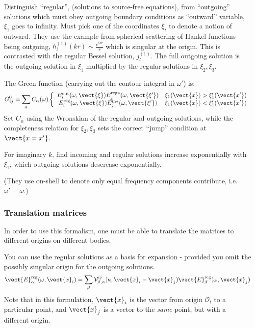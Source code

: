 Distinguish ``regular'', (solutions to source-free equations), from ``outgoing'' solutions
which must obey outgoing boundary conditions as ``outward'' variable, $\xi_1$ goes to infinity.
Must pick one of the coordinates $\xi_i$ to denote a notion of outward.  
They use the example from spherical scattering of Hankel functions being outgoing, $h_l^{(1)}(kr)\sim \frac{e^{ikr}}{r}$
which is singular at the origin.  This is contrasted with the regular Bessel solution, $j_l^{(1)}$.  
The full outgoing solution is the outgoing solution in $\xi_1$ multiplied by the regular solutions
in $\xi_2,\xi_3$.  

The Green function (carrying out the contour integral in $\omega'$) is:
\begin{equation}
G^0_{ij}=\sum_\alpha C_\alpha(\omega)\left\{\begin{array}{cr}
E_i^\mathrm{out}(\omega,\vect{\xi}) E_j^{\mathrm{reg}*}(\omega,\vect{\xi'}) & \xi_1(\vect{x})>\xi_1'(\vect{x'})\\
E_i^\mathrm{reg}(\omega,\vect{\xi}) E_j^{\mathrm{in}*}(\omega,\vect{\xi'}) & \xi_1(\vect{x})<\xi_1'(\vect{x'})
\end{array}
\right.
\end{equation}
Set $C_\alpha$ using the Wronskian of the regular and outgoing solutions, while the completeness
relation for $\xi_2,\xi_3$ sets the correct ``jump'' condition at $\vect{x=x'}$.  

For imaginary $k$, find incoming and regular solutions increase exponentially with $\xi_1$,
which outgoing solutions descrease exponentially.  

(They  use on-shell to denote only equal frequency components contribute, i.e. $\omega'=\omega$.)

\subsubsection{Translation matrices}

In order to use this formalism, one must be able to translate the matrices to different origins on
different bodies.  

You can use the regular solutions as a basis for expansion - provided you omit the possibly 
singular origin for the outgoing solutions.  
\begin{equation}
\vect{E}^\text{reg}_\alpha(\omega,\vect{x}_i) = \sum_{\beta}\mathcal{V}^{ij}_{\beta,\alpha}(\kappa,\vect{x}_i-\vect{x}_j)
\vect{E}^\text{reg}_\beta(\omega,\vect{x}_j)
\end{equation}
Note that in this formulation, $\vect{x}_i$ is the vector from origin $\mathcal{O}_i$ to a particular 
point, and $\vect{x}_j$ is a vector to the \emph{same} point, but with a different origin.  


